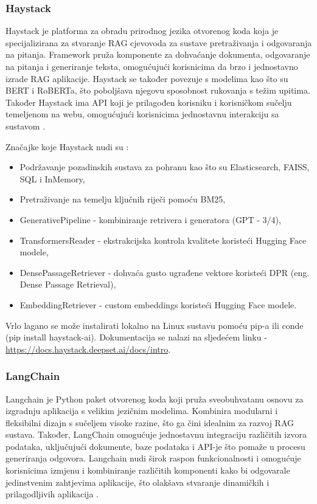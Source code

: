 \documentclass[]{foi}
\begin{document}
\subsubsection{Haystack}
Haystack je platforma za obradu prirodnog jezika otvorenog koda koja je specijalizirana za stvaranje RAG cjevovoda za sustave pretraživanja 
i odgovaranja na pitanja. Framework pruža komponente za dohvaćanje dokumenta, odgovaranje na pitanja i generiranje teksta, omogućujući korisnicima
da brzo i jednostavno izrade RAG aplikacije. Haystack se također povezuje s modelima kao što su BERT i RoBERTa, što poboljšava njegovu sposobnost 
rukovanja s težim upitima. Također Haystack ima API koji je prilagođen korisniku i korisničkom sučelju temeljenom na webu, omogućujući korisnicima
jednostavnu interakciju sa sustavom \cite{novogroder2025ragtools}.

Značajke koje Haystack nudi su \cite{novogroder2025ragtools}:
\begin{itemize}
    \item Podržavanje pozadinskih sustava za pohranu kao što su Elasticsearch, FAISS, SQL i InMemory,
    \item Pretraživanje na temelju ključnih riječi pomoću BM25,
    \item GenerativePipeline - kombiniranje retrivera i generatora (GPT - 3/4),
    \item TransformersReader - ekstrakcijska kontrola kvalitete koristeći Hugging Face modele,
    \item DensePassageRetriever - dohvaća gusto ugrađene vektore koristeći DPR (eng. Dense Passage Retrieval),
    \item EmbeddingRetriever - custom embeddings koristeći Hugging Face modele.
\end{itemize}

Vrlo lagano se može instalirati lokalno na Linux sustavu pomoću pip-a ili conde (pip install haystack-ai). Dokumentacija se nalazi na sljedećem linku - \url{https://docs.haystack.deepset.ai/docs/intro}. 

\subsubsection{LangChain}
Langchain je Python paket otvorenog koda koji pruža sveobuhvatanu osnovu za izgradnju aplikacija s velikim jezičnim modelima. Kombinira modularni i fleksibilni dizajn s sučeljem
visoke razine, što ga čini idealnim za razvoj RAG sustava. Također, LangChain omogućuje jednostavnu integraciju različitih izvora podataka, uključujući dokumente, baze podataka i API-je što pomaže u procesu
generiranja odgovora. Langchain nudi širok raspon funkcionalnosti i omogućuje korisnicima izmjenu i kombiniranje različitih komponenti kako bi odgovarale jedinstvenim zahtjevima aplikacije,
što olakšava stvaranje dinamičkih i prilagodljivih aplikacija \cite{novogroder2025ragtools}.
\end{document}
